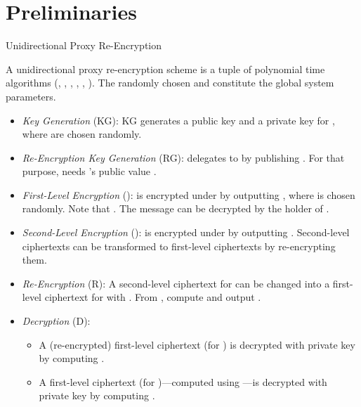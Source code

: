 \documentclass{llncs}
\begin{document}
\section{Preliminaries} \label{preliminaries}


\begin{definition}{Unidirectional Proxy Re-Encryption} \cite{ateniese_improved}
\label{re-enc}

A unidirectional proxy re-encryption scheme is a tuple of polynomial time algorithms (, , , , , ). The randomly chosen  and  constitute the global system parameters.

\begin{itemize}

\item \emph{Key Generation} (KG): KG generates a public key  and a private key  for , where  are chosen randomly. 

\item \emph{Re-Encryption Key Generation} (RG):  delegates to  by publishing . For that purpose,  needs 's public value . 

\item \emph{First-Level Encryption} ():  is encrypted under  by outputting , where  is chosen randomly. Note that . The message can be decrypted by the holder of . 

\item \emph{Second-Level Encryption} ():  is encrypted under  by outputting . Second-level ciphertexts can be transformed to first-level ciphertexts by re-encrypting them. 

\item \emph{Re-Encryption} (R): A second-level ciphertext for  can be changed into a first-level ciphertext for  with . From , compute  and output . 

\item \emph{Decryption} (D): 

\begin{itemize}
\item A (re-encrypted) first-level ciphertext  (for ) is decrypted with private key  by computing . 
\item A first-level ciphertext  (for )---computed using ---is decrypted with private key  by computing .
\end{itemize}

\end{itemize}

\end{definition}
\end{document}
